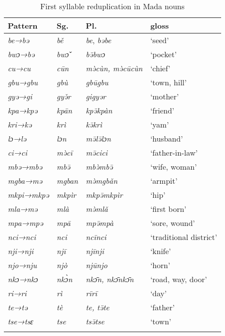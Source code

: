 \documentclass[output=paper]{langsci/langscibook}
\begin{document}
\begin{table}
\caption{\label{tab:nomaffplat:13}First syllable reduplication in Mada nouns}

\begin{tabularx}{\textwidth}{lllX}
\lsptoprule
Pattern 	&  {Sg.} 	&   {Pl.} 	&  gloss\\
\midrule
\textit{be→bə} 	& \textit{bě }	& \textit{be}, \textit{bəbe}	&   ‘seed’ \\
\tablevspace	
\textit{bwɔ→bə} 	& \textit{bwɔ̌} 	& \textit{bə̄bwɔ} 	&   	‘pocket’\\
\tablevspace	
\textit{cu→cu} 	& \itshape cūn 	& \itshape mə̀cùn, mə̀cūcùn	& ‘chief’\\
\tablevspace	
\textit{gbu→gbu}	& \itshape gbù 	& \itshape gbūgbu 	& ‘town, hill’\\
\tablevspace	
\textit{gyə→gi} 	& \itshape gyə̌r 	& \itshape gigyər 	& ‘mother’\\
\tablevspace	
\textit{kpa→kpə}	& \itshape kpān 	& \itshape kpə̄kpàn 	& ‘friend’\\
\tablevspace	
\textit{kri→kə} 	& \itshape krì 	& \itshape kə̄krì 	& ‘yam’\\
\tablevspace	
\itshape lɔ→lə 	& \itshape lɔn 	& \itshape mə̄lə̄lɔn 	& ‘husband’\\
\tablevspace	
\textit{ci→ci} 	& \itshape mə̀cī 	& \textit{mə̄cici} 	& ‘father-in-law’ \\
\tablevspace	
\textit{mbə→mbə}	& \itshape mbə̄ 	& \itshape mbə̀mbə̄ 	& ‘wife, woman’\\
\tablevspace	
\textit{mgba→mə}	& \itshape mgban	& \itshape mə̀mgbǎn 	& ‘armpit’\\
\tablevspace	
\itshape mkpi→mkpə	& \itshape mkpìr	& \itshape mkpə̄mkpìr 	& ‘hip’\\
\tablevspace	
\itshape mla→mə 	& \itshape mlà 	& \itshape mə̀mlǎ 	& ‘first born’\\
\tablevspace	
\textit{mpa→mpə}	& \itshape mpā 	& \itshape mpə̄mpà 	& ‘sore, wound’\\
\tablevspace	
\itshape nci→nci	& \itshape nci 	& \itshape ncīnci 	& ‘traditional district’\\
\tablevspace	
\itshape nji→nji	& \itshape njī 	& {\itshape njīnji} 	&‘knife’ \\
\tablevspace	
\textit{njo→nju}	& \itshape njò 	& \itshape njūnjo 	& ‘horn’\\
\tablevspace	
\textit{nkɔ→nkɔ}	& \itshape nkɔ̀n 	& \itshape nkɔ̄n, nkɔ̄nkɔ̄n	& ‘road, way, door’\\
\tablevspace	
\textit{ri→ri} 	& \itshape rì 	& \itshape rīrī 	& ‘day’\\
\tablevspace	
\textit{te→tə} 	& \itshape tè 	& \itshape te, tə̄te 	& ‘father’\\
\tablevspace	
\itshape tse→tsɛ	& \itshape tse 	& \itshape tsə̄tse 	& ‘town’\\
\lspbottomrule
\end{tabularx}
\end{table}
  
\end{document}
